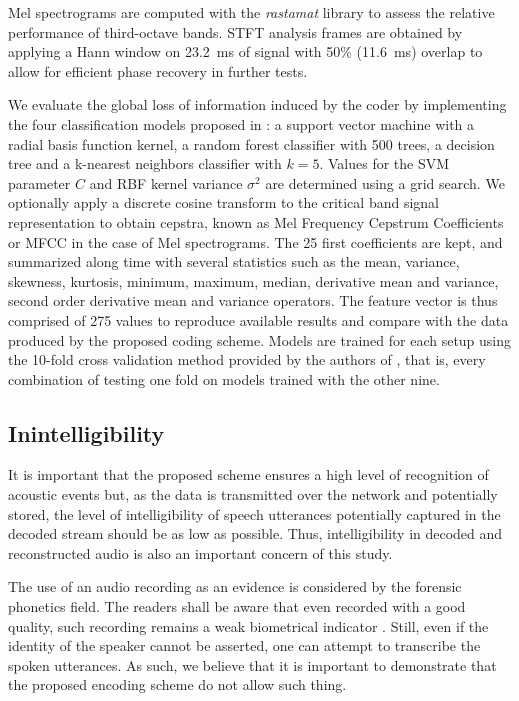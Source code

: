 \documentclass[sensors,article,submit,moreauthors,pdftex,10pt,a4paper]{mdpi}
\begin{document}
Mel spectrograms are computed with the \textit{rastamat} library \cite{ellis2005} to assess the relative performance of third-octave bands. STFT analysis frames are obtained by applying a Hann window on 23.2~ms of signal with 50\% (11.6~ms) overlap to allow for efficient phase recovery in further tests.

We evaluate the global loss of information induced by the coder by implementing the four classification models proposed in \cite{salamon2014}: a support vector machine with a radial basis function kernel, a random forest classifier with 500 trees, a decision tree and a k-nearest neighbors classifier with $k = 5$. Values for the SVM parameter $C$ and RBF kernel variance $\sigma^2$ are determined using a grid search. We optionally apply a discrete cosine transform to the critical band signal representation to obtain cepstra, known as Mel Frequency Cepstrum Coefficients or MFCC in the case of Mel spectrograms. The 25 first coefficients are kept, and summarized along time with several statistics such as the mean, variance, skewness, kurtosis, minimum, maximum, median, derivative mean and variance, second order derivative mean and variance operators. The feature vector is thus comprised of 275 values to reproduce available results and compare with the data produced by the proposed coding scheme. Models are trained for each setup using the 10-fold cross validation method provided by the authors of \cite{salamon2014}, that is, every combination of testing one fold on models trained with the other nine.

\subsection{Inintelligibility} \label{sec:inintelligibility}

It is important that the proposed scheme ensures a high level of recognition of acoustic events but, as the data is transmitted over the network and potentially stored, the level of intelligibility of  speech utterances potentially captured in the decoded stream should be as low as possible. Thus, intelligibility in decoded and reconstructed audio is also an important concern of this study.

The use of an audio recording as an evidence is considered by the forensic phonetics \cite{baldwin1990forensic} field. The readers shall be aware that even recorded with a good quality, such recording remains a weak biometrical indicator \cite{boe2000forensic}. Still, even if the identity of the speaker cannot be asserted, one can attempt to transcribe the spoken utterances. As such, we believe that it is important to demonstrate that the proposed encoding scheme do not allow such thing.
\end{document}
